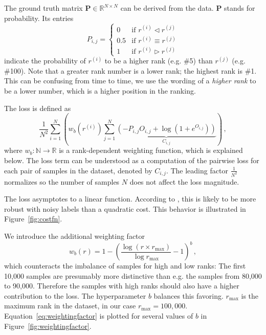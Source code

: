 The ground truth matrix $\bm{P}\in\mathbb{R}^{N\times N}$ can be derived from the data. $\bm{P}$ stands for probability. Its entries\begin{equation}\label{eq:groundtruthmatrix}
    P_{i,j}=\begin{cases}
        0&\text{if }r^{(i)}\triangleleft r^{(j)}\\
        0.5&\text{if }r^{(i)}\equiv r^{(j)}\\
        1&\text{if }r^{(i)}\triangleright r^{(j)}
    \end{cases}
\end{equation}indicate the probability of $r^{(i)}$ to be a higher rank (e.g. \#5) than $r^{(j)}$ (e.g. \#100). Note that a greater rank number is a lower rank; the highest rank is \#1. This can be confusing from time to time, we use the wording of a \textit{higher rank} to be a lower number, which is a higher position in the ranking.

The loss is defined as
\begin{equation}
    \label{eq:loss}
    \frac{1}{N^2}\sum_{i=1}^N\left(
        w_b\left(r^{(i)}\right)\sum_{j=1}^N
            \underbrace{\left(-P_{i,j}O_{i,j}+\log\left(1+e^{O_{i,j}}\right)\right)}_{C_{i,j}}
    \right)\,,
\end{equation}where $w_b:\mathbb{N}\rightarrow\mathbb{R}$ is a rank-dependent weighting function, which is explained below. The loss term can be understood as a computation of the pairwise loss for each pair of samples in the dataset, denoted by $C_{i,j}$. The leading factor $\frac{1}{N^2}$ normalizes so the number of samples $N$ does not affect the loss magnitude.

The loss asymptotes to a linear function. According to \cite{Burges:learningtorankwithsgd}, this is likely to be more robust with noisy labels than a quadratic cost. This behavior is illustrated in Figure~\ref{fig:costfn}.

We introduce the additional weighting factor
\begin{equation}\label{eq:weightingfactor}
    w_b(r)=1-\left(\frac{\log\left(r\times r_\text{max}\right)}{\log r_\text{max}}-1\right)^b\,,
\end{equation}which counteracts the imbalance of samples for high and low ranks: The first 10,000 samples are presumably more distinctive than e.g. the samples from 80,000 to 90,000. Therefore the samples with high ranks should also have a higher contribution to the loss. The hyperparameter $b$ balances this favoring. $r_\text{max}$ is the maximum rank in the dataset, in our case $r_\text{max}=100,000$. Equation~\ref{eq:weightingfactor} is plotted for several values of $b$ in Figure~\ref{fig:weightingfactor}.

